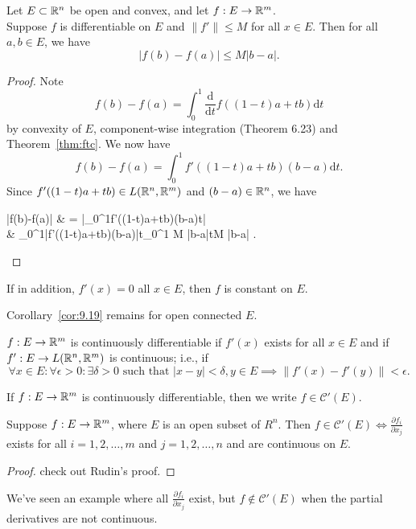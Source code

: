 \begin{thm}[19]
	Let $E \subset \mathbb{R}^{n}$ be open and convex, and let $f: E\to \mathbb{R}^{m}$.\\
	Suppose $f$ is differentiable on $E$ and $\|f'\|\le M$ for all $x \in E$.
	Then for all $a,b \in E$, we have
	\[
		\left|f(b)-f(a)\right|\le M \left|b-a\right|
		.\]
	\begin{proof}
		Note \[
			f(b)-f(a)=\int_{0}^{1}{\frac{\mathrm{d}}{\mathrm{d}t}f((1-t)a+tb)\mathrm{d}t}
		\]
		by convexity of $E$,  component-wise integration (Theorem 6.23) and Theorem~\ref{thm:ftc}.
		We now have \[
			f(b)-f(a)=\int_{0}^{1}{f'((1-t)a+tb)(b-a)\mathrm{d}t}
			.\]
		Since $f'((1-t)a+tb) \in L(\mathbb{R}^{n},\mathbb{R}^{m})$ and $(b-a) \in \mathbb{R}^{n}$, we have
		\begin{flalign*}
			\left|f(b)-f(a)\right| & = \left|\int_{0}^{1}{f'((1-t)a+tb)(b-a)t}\right|                                                                         \\
			                       & \le \int_{0}^{1}{\left|f'((1-t)a+tb)(b-a)\right|t}\le \int_{0}^{1}{ M \left|b-a\right|t}\le M \left|b-a\right|
			.\end{flalign*}
	\end{proof}
\end{thm}

\begin{corollary}
	\label{cor:9.19}
	If in addition, $f'(x)=0$ all $x \in E$, then $f$ is constant on $E$.
\end{corollary}

\begin{problem}[9.9]
Corollary~\ref{cor:9.19} remains for open connected $E$.
\end{problem}

\begin{define}
	$f:E\to \mathbb{R}^{m}$ is continuously differentiable if $f'(x)$ exists for all $x \in E$ and if $f':E\to L(\mathbb{R}^{n},\mathbb{R}^{m})$ is continuous; i.e., if
	\[
		\forall{x \in E}: \forall{\epsilon > 0}: \exists{\delta > 0} \text{ such that } \left|x-y\right|<\delta, y \in E \implies \|f'(x)-f'(y)\|<\epsilon
		.\]
\end{define}
\begin{notation}
	If $f:E\to \mathbb{R}^{m}$ is continuously differentiable, then we write $f \in \mathcal{C}'(E)$.
\end{notation}

\begin{thm}
	Suppose $f: E\to \mathbb{R}^{m}$, where $E$ is an open subset of $R^{n}.$
	Then $f \in \mathcal{C}'(E) \Leftrightarrow \frac{\partial{f_{i}}}{\partial{x_j}}$ exists for all $i=1,2,\ldots,m$ and $j=1,2,\ldots,n$ and are continuous on $E$.
	\begin{proof}
		check out Rudin's proof.
	\end{proof}

	\begin{note}
		We've seen an example where all $\frac{\partial{f_i}}{\partial{x_j}}$ exist, but $f \not\in \mathcal{C}'(E)$ when the partial derivatives are not continuous.
	\end{note}
\end{thm}
